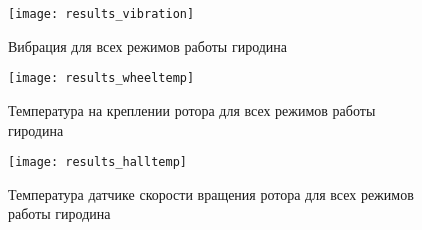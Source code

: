 \begin{figure}[h]
\texttt{[image: results\_vibration]}
\caption{Вибрация для всех режимов работы гиродина}
\label{fig:spec:results:vibration}
\end{figure}

\begin{figure}[h]
\texttt{[image: results\_wheeltemp]}
\caption{Температура на креплении ротора для всех режимов работы гиродина}
\label{fig:spec:results:wheeltemp}
\end{figure}

\begin{figure}[h]
\texttt{[image: results\_halltemp]}
\caption{Температура датчике скорости вращения ротора для всех режимов работы гиродина}
\label{fig:spec:results:halltemp}
\end{figure}